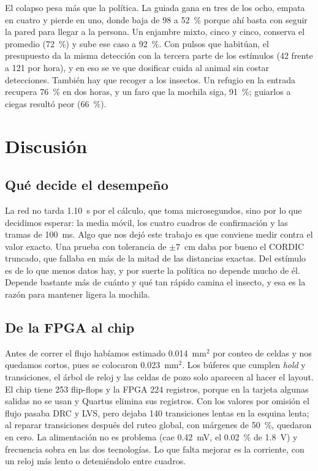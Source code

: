 \documentclass[conference,letterpaper,10pt]{IEEEtran}
\begin{document}
El colapso pesa más que la política. La guiada gana en tres de los ocho, empata en cuatro y pierde en uno, donde baja de 98 a 52~\% porque
ahí basta con seguir la pared para llegar a la persona. Un enjambre mixto, cinco y cinco, conserva el promedio (72~\%) y sube ese caso a
92~\%. Con pulsos que habitúan, el presupuesto da la misma detección con la tercera parte de los estímulos (42 frente a 121 por hora), y en eso se ve que dosificar cuida al animal sin costar detecciones. También hay que recoger a los insectos. Un refugio en la entrada recupera 76~\% en
dos horas, y un faro que la mochila siga, 91~\%; guiarlos a ciegas resultó peor (66~\%).

\section{Discusión}

\subsection{Qué decide el desempeño}

La red no tarda 1.10~s por el cálculo, que toma microsegundos, sino por lo que decidimos esperar: la media móvil, los cuatro cuadros de
confirmación y las tramas de 100~ms. Algo que nos dejó este trabajo es que conviene medir contra el valor exacto. Una prueba con tolerancia
de $\pm7$~cm daba por bueno el CORDIC truncado, que fallaba en más de la mitad de las distancias exactas. Del estímulo es de lo que menos datos hay, y por suerte la política no depende mucho de él. Depende bastante más de cuánto y qué tan
rápido camina el insecto, y esa es la razón para mantener ligera la mochila.

\subsection{De la FPGA al chip}

Antes de correr el flujo habíamos estimado 0.014~mm$^2$ por conteo de celdas y nos quedamos cortos, pues se colocaron 0.023~mm$^2$. Los
búferes que cumplen \textit{hold} y transiciones, el árbol de reloj y las celdas de pozo solo aparecen al hacer el layout. El chip tiene 253
flip-flops y la FPGA 224 registros, porque en la tarjeta algunas salidas no se usan y Quartus elimina sus registros. Con los valores por
omisión el flujo pasaba DRC y LVS, pero dejaba 140 transiciones lentas en la esquina lenta; al reparar transiciones después del ruteo
global, con márgenes de 50~\%, quedaron en cero. La alimentación no es problema (cae 0.42~mV, el 0.02~\% de 1.8~V) y frecuencia sobra en las dos tecnologías. Lo que falta mejorar es la
corriente, con un reloj más lento o deteniéndolo entre cuadros.
\end{document}
